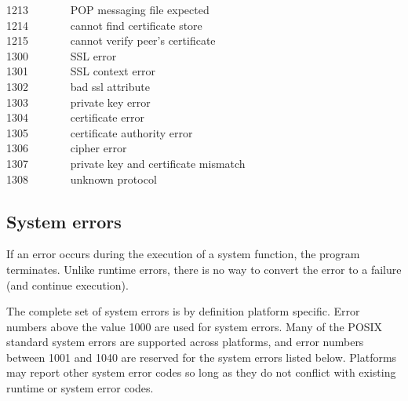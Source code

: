 1213 \ \ \ \ \ \ \ POP messaging file expected\\
1214 \ \ \ \ \ \ \ cannot find certificate store\\
1215 \ \ \ \ \ \ \ cannot verify peer's certificate\\
1300 \ \ \ \ \ \ \ SSL error\\
1301 \ \ \ \ \ \ \ SSL context error\\
1302 \ \ \ \ \ \ \ bad ssl attribute\\
1303 \ \ \ \ \ \ \ private key error\\
1304 \ \ \ \ \ \ \ certificate error\\
1305 \ \ \ \ \ \ \ certificate authority error\\
1306 \ \ \ \ \ \ \ cipher error\\
1307 \ \ \ \ \ \ \ private key and certificate mismatch\\
1308 \ \ \ \ \ \ \ unknown protocol\\

\subsection*{System errors}

If an error occurs during the execution of a system
function, the program terminates. Unlike runtime errors, there is no way
to convert the error to a failure (and continue execution).

The complete set of system errors is by definition platform
specific. Error numbers above the value 1000 are used for system errors. Many of
the POSIX standard system errors are supported across platforms, and error
numbers between 1001 and 1040 are reserved for the system errors listed
below. Platforms may report other system error codes so long as they do not
conflict with existing runtime or system error codes.

